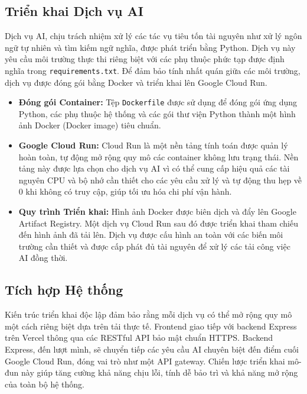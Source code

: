 \subsection{Triển khai Dịch vụ AI}
Dịch vụ AI, chịu trách nhiệm xử lý các tác vụ tiêu tốn tài nguyên như xử lý ngôn ngữ tự nhiên và tìm kiếm ngữ nghĩa, được phát triển bằng Python. Dịch vụ này yêu cầu môi trường thực thi riêng biệt với các phụ thuộc phức tạp được định nghĩa trong \texttt{requirements.txt}. Để đảm bảo tính nhất quán giữa các môi trường, dịch vụ được đóng gói bằng Docker và triển khai lên Google Cloud Run.

\begin{itemize}
    \item \textbf{Đóng gói Container:} Tệp \texttt{Dockerfile} được sử dụng để đóng gói ứng dụng Python, các phụ thuộc hệ thống và các gói thư viện Python thành một hình ảnh Docker (Docker image) tiêu chuẩn.
    \item \textbf{Google Cloud Run:} Cloud Run là một nền tảng tính toán được quản lý hoàn toàn, tự động mở rộng quy mô các container không lưu trạng thái. Nền tảng này được lựa chọn cho dịch vụ AI vì có thể cung cấp hiệu quả các tài nguyên CPU và bộ nhớ cần thiết cho các yêu cầu xử lý và tự động thu hẹp về 0 khi không có truy cập, giúp tối ưu hóa chi phí vận hành.
    \item \textbf{Quy trình Triển khai:} Hình ảnh Docker được biên dịch và đẩy lên Google Artifact Registry. Một dịch vụ Cloud Run sau đó được triển khai tham chiếu đến hình ảnh đã tải lên. Dịch vụ được cấu hình an toàn với các biến môi trường cần thiết và được cấp phát đủ tài nguyên để xử lý các tải công việc AI đồng thời.
\end{itemize}

\subsection{Tích hợp Hệ thống}
Kiến trúc triển khai độc lập đảm bảo rằng mỗi dịch vụ có thể mở rộng quy mô một cách riêng biệt dựa trên tải thực tế. Frontend giao tiếp với backend Express trên Vercel thông qua các RESTful API bảo mật chuẩn HTTPS. Backend Express, đến lượt mình, sẽ chuyển tiếp các yêu cầu AI chuyên biệt đến điểm cuối Google Cloud Run, đóng vai trò như một API gateway. Chiến lược triển khai mô-đun này giúp tăng cường khả năng chịu lỗi, tính dễ bảo trì và khả năng mở rộng của toàn bộ hệ thống.